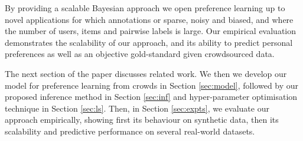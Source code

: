 By providing a scalable Bayesian approach we open preference learning up to novel applications
for which annotations or sparse, noisy and biased, and where the number of users, items and pairwise labels is large.
Our empirical evaluation demonstrates the scalability of our approach,
and its ability to predict personal preferences as well as an objective gold-standard given crowdsourced data.

The next section of the paper discusses related work.
We then we develop our model for preference learning from crowds in Section \ref{sec:model},
followed by our proposed inference method in Section \ref{sec:inf} and
hyper-parameter optimisation technique in Section \ref{sec:ls}.
Then, in Section \ref{sec:expts}, 
we evaluate our approach empirically, showing first its behaviour on synthetic data, 
then its scalability and predictive performance on several real-world datasets.
